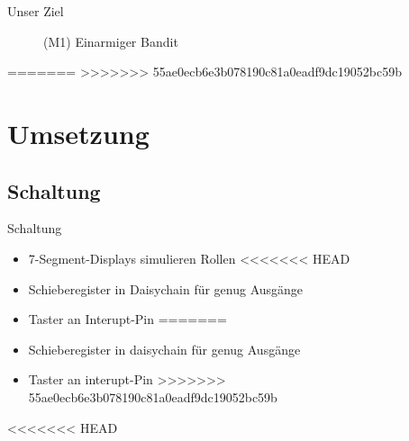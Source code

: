 \documentclass[mathserif,9pt]{article}
\begin{document}
\begin{frame}{Unser Ziel}
\begin{block}{}
\begin{minipage}[c]{0.35\textwidth}
\begin{figure}
                    \caption[M1]{(M1) Einarmiger Bandit}
                    \label{fig:slot_mashine}
                \end{figure}
            \end{minipage}
=======
>>>>>>> 55ae0ecb6e3b078190c81a0eadf9dc19052bc59b
        \end{block}
    \end{frame}

    \section{Umsetzung}
    \subsection{Schaltung}
    \begin{frame}{Schaltung}
        \begin{block}{}
            \begin{minipage}[c]{0.6\textwidth}
                \begin{itemize}
                    \item 7-Segment-Displays simulieren Rollen
<<<<<<< HEAD
                    \item Schieberegister in Daisychain für genug Ausgänge
                    \item Taster an Interupt-Pin 
=======
                    \item Schieberegister in daisychain für genug Ausgänge
                    \item Taster an interupt-Pin 
>>>>>>> 55ae0ecb6e3b078190c81a0eadf9dc19052bc59b
                \end{itemize}
            \end{minipage}
            \hfill
            \begin{minipage}[c]{0.3\textwidth}
<<<<<<< HEAD
               \begin{figure}

\end{figure}
\end{minipage}
\end{block}
\end{frame}
\end{document}
